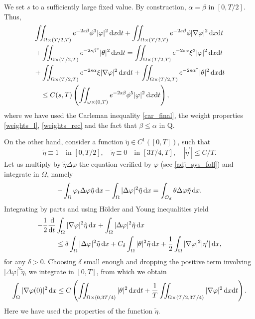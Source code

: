 \documentclass{aims}
\theoremstyle{definition}
\def\dx{\,\textnormal{d}x}
\def\dt{\textnormal{d}t}
\def\d{\,\textnormal{d}}
\begin{document}
We set $s$ to a sufficiently large fixed value. By construction, $\alpha=\beta$ in $[0,T/2]$. Thus, 
%
\begin{align} \notag 
&\iint_{\Omega\times(T/2,T)}e^{-2s\beta}\phi^3|\varphi|^2\dx\dt+\iint_{\Omega\times(T/2,T)}e^{-2s\beta}\phi|\nabla \varphi|^2\dx\dt \\ \notag
&+\iint_{\Omega\times(T/2,T)}e^{-2s\beta^*}|\theta|^2\dx\dt = \iint_{\Omega\times(T/2,T)}e^{-2s\alpha}\xi^3|\varphi|^2\dx\dt \\ \notag
&+ \iint_{\Omega\times(T/2,T)}e^{-2s\alpha}\xi|\nabla\varphi|^2\dx\dt + \iint_{\Omega\times(T/2,T)}e^{-2s\alpha^*}|\theta|^2\dx\dt \\ \label{car_rec}
&\quad \leq  C(s,T)\left(\iint_{\omega\times(0,T)}e^{-2s\beta}\phi^5|\varphi|^2\dx\dt\right),
\end{align}
%
where we have used the Carleman inequality \eqref{car_final}, the weight properties \eqref{weights_l}, \eqref{weights_rec} and the fact that $\beta\leq \alpha$ in Q. 

On the other hand, consider a function $\tilde \eta\in C^1([0,T])$, such that 
%
\begin{equation*}
\tilde\eta \equiv 1 \quad\text{in } [0,T/2], \quad \tilde\eta\equiv 0 \quad \text{in } [3T/4,T], \quad |\tilde\eta^\prime|\leq C/T.
\end{equation*}
%
Let us multiply by $\tilde\eta\Delta\varphi$ the equation verified by $\varphi$ (see \eqref{adj_sys_foll}) and integrate in $\Omega$, namely 
%
\begin{equation*}
-\int_{\Omega}\varphi_t\Delta\varphi\tilde\eta\dx-\int_{\Omega}|\Delta \varphi|^2\tilde\eta\dx=\int_{\mathcal O_d}\theta\Delta\varphi\tilde \eta\dx.
\end{equation*}
%
Integrating by parts and using H\"older and Young inequalities yield
%
\begin{equation*}
\begin{split}
-\frac{1}{2}\frac{\d}{\dt}&\int_{\Omega}|\nabla\varphi|^2\tilde\eta\dx+\int_{\Omega}|\Delta\varphi|^2\tilde\eta\dx\\
&\leq \delta \int_{\Omega}|\Delta\varphi|^2\tilde\eta\dx+C_\delta\int_{\Omega}|\theta|^2\tilde\eta\dx+\frac{1}{2}\int_{\Omega}|\nabla\varphi|^2|\eta^\prime|\dx,
\end{split}
\end{equation*}
%
for any $\delta>0$.  Choosing $\delta$ small enough and dropping the positive term involving $|\Delta\varphi|^2\tilde\eta$, we integrate in $[0,T]$, from which we obtain
%
\begin{equation}\label{nabla_theta_0}
\int_{\Omega}|\nabla\varphi(0)|^2\dx\leq C\left(\iint_{\Omega\times(0,3T/4)}|\theta|^2\dx\dt+\frac{1}{T}\iint_{\Omega\times(T/2,3T/4)}|\nabla\varphi|^2\dx\dt\right).
\end{equation}
%
Here we have used the properties of the function $\tilde\eta$. 
\end{document}
